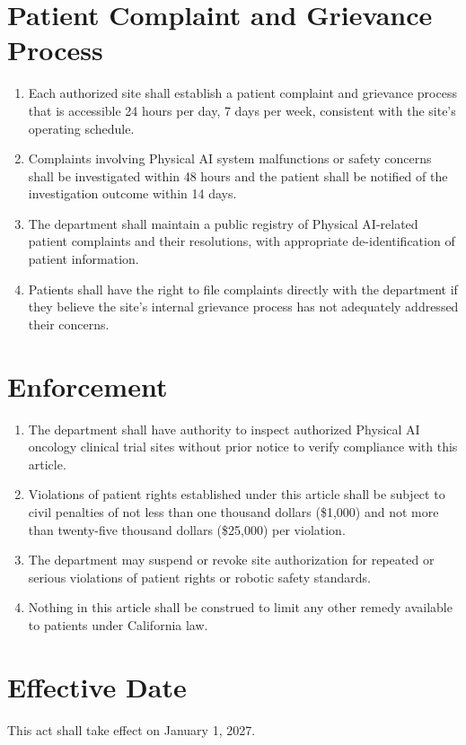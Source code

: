 \documentclass[11pt,letterpaper]{article}
\begin{document}
\section{Patient Complaint and Grievance Process}

\begin{enumerate}[label=(\alph*)]
\item Each authorized site shall establish a patient complaint and grievance
  process that is accessible 24 hours per day, 7 days per week, consistent
  with the site's operating schedule.

\item Complaints involving Physical AI system malfunctions or safety concerns
  shall be investigated within 48 hours and the patient shall be notified of
  the investigation outcome within 14 days.

\item The department shall maintain a public registry of Physical AI-related
  patient complaints and their resolutions, with appropriate de-identification
  of patient information.

\item Patients shall have the right to file complaints directly with the
  department if they believe the site's internal grievance process has not
  adequately addressed their concerns.
\end{enumerate}

\section{Enforcement}

\begin{enumerate}[label=(\alph*)]
\item The department shall have authority to inspect authorized Physical AI
  oncology clinical trial sites without prior notice to verify compliance
  with this article.

\item Violations of patient rights established under this article shall be
  subject to civil penalties of not less than one thousand dollars (\$1,000)
  and not more than twenty-five thousand dollars (\$25,000) per violation.

\item The department may suspend or revoke site authorization for repeated or
  serious violations of patient rights or robotic safety standards.

\item Nothing in this article shall be construed to limit any other remedy
  available to patients under California law.
\end{enumerate}

\section{Effective Date}

This act shall take effect on January 1, 2027.

\printbibliography[title={References}]
\end{document}

